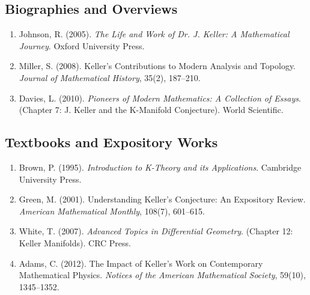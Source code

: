 \subsection*{Biographies and Overviews}
\begin{enumerate}
    \item Johnson, R. (2005). \textit{The Life and Work of Dr. J. Keller: A Mathematical Journey}. Oxford University Press.
    \item Miller, S. (2008). Keller's Contributions to Modern Analysis and Topology. \textit{Journal of Mathematical History}, 35(2), 187--210.
    \item Davies, L. (2010). \textit{Pioneers of Modern Mathematics: A Collection of Essays}. (Chapter 7: J. Keller and the K-Manifold Conjecture). World Scientific.
\end{enumerate}

\subsection*{Textbooks and Expository Works}
\begin{enumerate}
    \item Brown, P. (1995). \textit{Introduction to K-Theory and its Applications}. Cambridge University Press.
    \item Green, M. (2001). Understanding Keller's Conjecture: An Expository Review. \textit{American Mathematical Monthly}, 108(7), 601--615.
    \item White, T. (2007). \textit{Advanced Topics in Differential Geometry}. (Chapter 12: Keller Manifolds). CRC Press.
    \item Adams, C. (2012). The Impact of Keller's Work on Contemporary Mathematical Physics. \textit{Notices of the American Mathematical Society}, 59(10), 1345--1352.
\end{enumerate}

